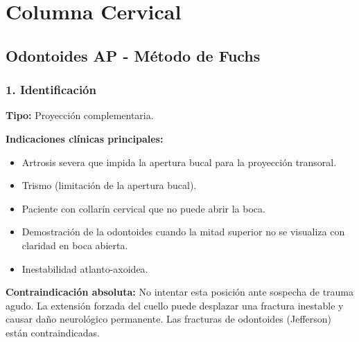 	\twocolumn
	\clearpage
	
	
	
		
	\section{Columna Cervical}
		
		\subsection{Odontoides AP - Método de Fuchs}
		
		\subsubsection*{1. Identificación}
		
		\textbf{Tipo:} Proyección complementaria.
		
		\textbf{Indicaciones clínicas principales:}
		\begin{itemize}
			\item Artrosis severa que impida la apertura bucal para la proyección transoral.
			\item Trismo (limitación de la apertura bucal).
			\item Paciente con collarín cervical que no puede abrir la boca.
			\item Demostración de la odontoides cuando la mitad superior no se visualiza con claridad en boca abierta.
			\item Inestabilidad atlanto-axoidea.
		\end{itemize}
		
		\textbf{Contraindicación absoluta:} No intentar esta posición ante sospecha de trauma agudo. La extensión forzada del cuello puede desplazar una fractura inestable y causar daño neurológico permanente. Las fracturas de odontoides (Jefferson) están contraindicadas.
		
